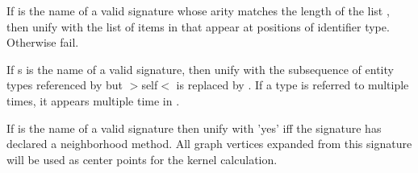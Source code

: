 \begin{description}
If  is the name of a valid signature whose arity matches the
length of the list , then unify  with the list of items in
 that appear at positions of identifier type. Otherwise fail.

If s is the name of a valid signature, then unify  with the
subsequence of entity types referenced by  but $>$self$<$ is replaced
by . If a type is referred to multiple times, it appears multiple
time in .

If  is the name of a valid signature then unify  with
'yes' iff the signature has declared a neighborhood method. All
graph vertices expanded from this signature will be used as center
points for the kernel calculation.
\end{description}

